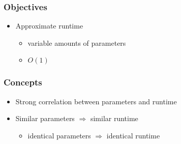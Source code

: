 

\begin{frame}
	\frametitle{Objectives}
		\begin{itemize}
			\pause			
			\item {Approximate runtime}
			\begin{itemize}
				\pause
				\item {variable amounts of parameters}
				\pause
				\item {$O(1)$}
			\end{itemize}
				
		\end{itemize}
\end{frame}		
		
\begin{frame} 
	\frametitle{Concepts}
		\begin{itemize}
			\item<2-> {Strong correlation between parameters and runtime}
			\item<3-> {Similar parameters $\Rightarrow$ similar runtime}
				\begin{itemize}
					\item<4-> {identical parameters $\Rightarrow$ identical runtime}	
				\end{itemize}	
		\end{itemize}
\end{frame}



